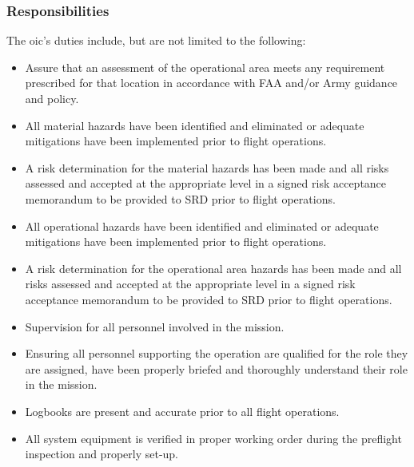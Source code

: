             \subsubsection{Responsibilities} The \ac{oic}'s duties include, but are not limited to the following:

            \begin{itemize}
                
                \item Assure that an assessment of the operational area meets any requirement prescribed for that location in accordance with FAA and/or Army guidance and policy.
                
                \item All material hazards have been identified and eliminated or adequate mitigations have been implemented prior to flight operations.
                
                \item A risk determination for the material hazards has been made and all risks assessed and accepted at the appropriate level in a signed risk acceptance memorandum to be provided to SRD prior to flight operations.
                
                \item All operational hazards have been identified and eliminated or adequate mitigations have been implemented prior to flight operations.
                
                \item A risk determination for the operational area hazards has been made and all risks assessed and accepted at the appropriate level in a signed risk acceptance memorandum to be provided to SRD prior to flight operations.

                \item Supervision for all personnel involved in the mission.

                \item Ensuring all personnel supporting the operation are qualified for the role they are assigned, have been properly briefed and thoroughly understand their role in the mission.

                \item Logbooks are present and accurate prior to all flight operations.

                \item All system equipment is verified in proper working order during the preflight inspection and properly set-up.


\end{itemize}
